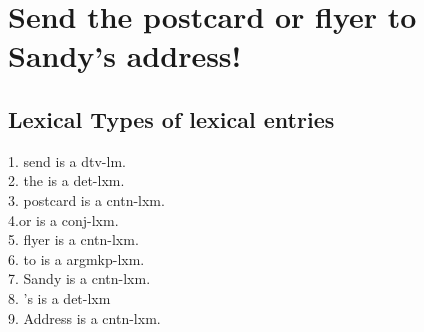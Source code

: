 \documentclass{article}
\begin{document}
\section{Send the postcard or flyer to Sandy's address!}
\subsection{Lexical Types of lexical entries}
1. send is a dtv-lm. \\ 2. the is a det-lxm. \\ 3. postcard is a cntn-lxm. \\ 4.or is a conj-lxm. \\ 5. flyer is a cntn-lxm. \\ 6. to is a argmkp-lxm. \\ 7. Sandy is a cntn-lxm. \\ 8. 's is a det-lxm \\ 9. Address is a cntn-lxm. \\ 
\end{document}
